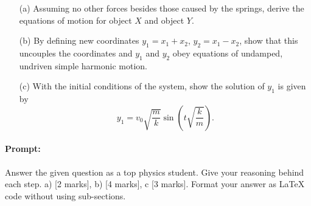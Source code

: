 \documentclass{article}
\begin{document}
\begin{enumerate}
    \item[(a)] Assuming no other forces besides those caused by the springs, derive the equations of motion for object $X$ and object $Y$.
    \item[(b)] By defining new coordinates $y_1 = x_1 + x_2$, $y_2 = x_1 - x_2$, show that this uncouples the coordinates and $y_1$ and $y_2$ obey equations of undamped, undriven simple harmonic motion.
    \item[(c)] With the initial conditions of the system, show the solution of $y_1$ is given by
    \[
    y_1 = v_0 \sqrt{\frac{m}{k}} \sin\left(t \sqrt{\frac{k}{m}}\right).
    \]
\end{enumerate}

\paragraph{Prompt: \\} 
Answer the given question as a top physics student. Give your reasoning behind each step. a) [2 marks], b) [4 marks], c [3 marks].
Format your answer as LaTeX code without using sub-sections.
\end{document}
